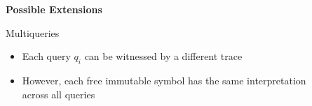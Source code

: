 \documentclass[10pt,aspectratio=149]{beamer}
\begin{document}

\begin{frame}{}
\LARGE
\centering
\bigskip

\textbf{Possible Extensions}

\end{frame}


\begin{frame}[t]{\alert{Multiqueries}}

\expr{%
(\checksys $S$ \\
\begin{tabular}{ll}
 \inputa 
   & (\,($i_1$ $\mi{\delta}_1$) $\,\cdots$ ($i_m$ $\mi{\delta}_m$)\,) \\
 \outputa
   & (\,($o_1$ $\mi{\tau}_1$) $\,\cdots$ ($o_n$ $\mi{\tau}_n$)\,) \\
 $\vdots$ \\  
   \alert{\queriesa} & (($q_1$ ($g_{1,1}$ $\,\cdots$ $g_{1,n_1}$)) $\cdots$ ($q_k$ ($g_{k,1}$ $\,\cdots$ $g_{k,n_k}$)))
\end{tabular} \\
)
}
\bigskip


\begin{itemize}
\item Each query $q_i$ can be witnessed by a \alert{different trace}
\item However, each free immutable symbol has the \alert{same interpretation} \\
      across all queries
\end{itemize}

\end{frame}

\end{document}
